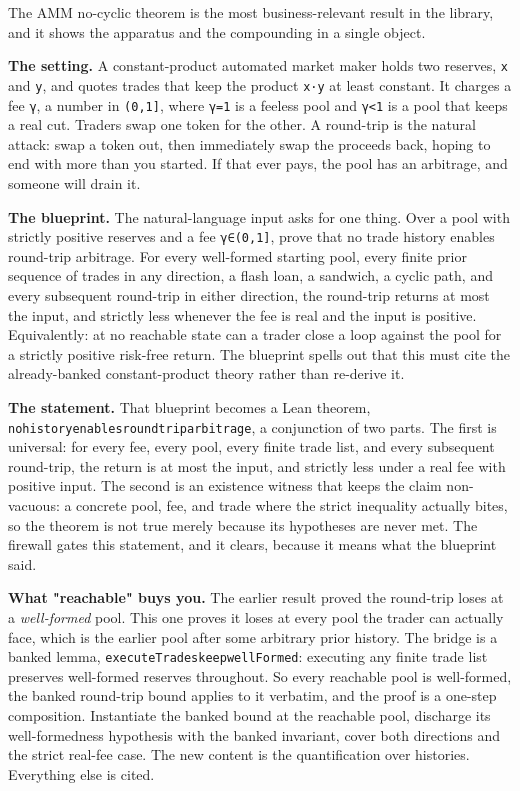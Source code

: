 \documentclass[
  11pt,
]{article}
\renewcommand{\_}{\origunderscore\allowbreak}
\begin{document}
The AMM no-cyclic theorem is the most business-relevant result in the
library, and it shows the apparatus and the compounding in a single
object.

\textbf{The setting.} A constant-product automated market maker holds
two reserves, \texttt{x} and \texttt{y}, and quotes trades that keep the
product \texttt{x·y} at least constant. It charges a fee \texttt{γ}, a
number in \texttt{(0,1{]}}, where \texttt{γ=1} is a feeless pool and
\texttt{γ\textless{}1} is a pool that keeps a real cut. Traders swap one
token for the other. A round-trip is the natural attack: swap a token
out, then immediately swap the proceeds back, hoping to end with more
than you started. If that ever pays, the pool has an arbitrage, and
someone will drain it.

\textbf{The blueprint.} The natural-language input asks for one thing.
Over a pool with strictly positive reserves and a fee
\texttt{γ∈(0,1{]}}, prove that no trade history enables round-trip
arbitrage. For every well-formed starting pool, every finite prior
sequence of trades in any direction, a flash loan, a sandwich, a cyclic
path, and every subsequent round-trip in either direction, the
round-trip returns at most the input, and strictly less whenever the fee
is real and the input is positive. Equivalently: at no reachable state
can a trader close a loop against the pool for a strictly positive
risk-free return. The blueprint spells out that this must cite the
already-banked constant-product theory rather than re-derive it.

\textbf{The statement.} That blueprint becomes a Lean theorem,
\texttt{no\_history\_enables\_round\_trip\_arbitrage}, a conjunction of
two parts. The first is universal: for every fee, every pool, every
finite trade list, and every subsequent round-trip, the return is at
most the input, and strictly less under a real fee with positive input.
The second is an existence witness that keeps the claim non-vacuous: a
concrete pool, fee, and trade where the strict inequality actually
bites, so the theorem is not true merely because its hypotheses are
never met. The firewall gates this statement, and it clears, because it
means what the blueprint said.

\textbf{What "reachable" buys you.} The earlier result proved the
round-trip loses at a \emph{well-formed} pool. This one proves it loses
at every pool the trader can actually face, which is the earlier pool
after some arbitrary prior history. The bridge is a banked lemma,
\texttt{executeTrades\_keep\_wellFormed}: executing any finite trade
list preserves well-formed reserves throughout. So every reachable pool
is well-formed, the banked round-trip bound applies to it verbatim, and
the proof is a one-step composition. Instantiate the banked bound at the
reachable pool, discharge its well-formedness hypothesis with the banked
invariant, cover both directions and the strict real-fee case. The new
content is the quantification over histories. Everything else is cited.
\end{document}
